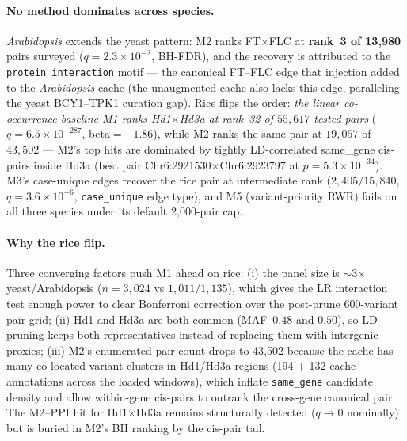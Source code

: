 \paragraph{No method dominates across species.}
\emph{Arabidopsis} extends the yeast pattern: M2 ranks
FT$\times$FLC at \textbf{rank~3 of 13{,}980} pairs surveyed
($q=2.3\!\times\!10^{-2}$, BH-FDR), and the recovery is attributed to
the \texttt{protein\_interaction} motif --- the canonical FT--FLC edge
that injection added to the \emph{Arabidopsis} cache (the
unaugmented cache also lacks this edge, paralleling the yeast
BCY1--TPK1 curation gap). Rice flips the order: \emph{the linear
co-occurrence baseline M1 ranks Hd1$\times$Hd3a at rank~32 of
$55{,}617$ tested pairs} ($q=6.5\!\times\!10^{-287}$, beta$=-1.86$),
while M2 ranks the same pair at $19{,}057$ of $43{,}502$ --- M2's
top hits are dominated by tightly LD-correlated same\_gene cis-pairs
inside Hd3a (best pair Chr6:2921530$\times$Chr6:2923797 at
$p=5.3\!\times\!10^{-34}$). M3's case-unique edges recover the rice
pair at intermediate rank ($2{,}405/15{,}840$, $q=3.6\!\times\!10^{-6}$,
\texttt{case\_unique} edge type), and M5 (variant-priority RWR) fails
on all three species under its default 2{,}000-pair cap.

\paragraph{Why the rice flip.}
Three converging factors push M1 ahead on rice: (i) the panel size is
$\sim$3$\times$ yeast/Arabidopsis ($n=3{,}024$ vs $1{,}011/1{,}135$),
which gives the LR interaction test enough power to clear Bonferroni
correction over the post-prune 600-variant pair grid; (ii) Hd1
and Hd3a are both common (MAF~$0.48$ and $0.50$), so LD pruning keeps
both representatives instead of replacing them with intergenic
proxies; (iii) M2's enumerated pair count drops to 43{,}502 because
the cache has many co-located variant clusters in Hd1/Hd3a regions
(194 + 132 cache annotations across the loaded windows), which inflate
\texttt{same\_gene} candidate density and allow within-gene cis-pairs
to outrank the cross-gene canonical pair. The M2--PPI hit for
Hd1$\times$Hd3a remains structurally detected ($q\!\to\!0$
nominally) but is buried in M2's BH ranking by the cis-pair tail.

